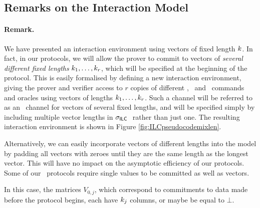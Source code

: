 \subsection{Remarks on the Interaction Model}

\paragraph{Remark.} We have presented an interaction environment using vectors of fixed length $k$. In fact, in our protocols, we will allow the prover to commit to vectors of \emph{several different fixed lengths} $k_1,\ldots,k_r$, which will be specified at the beginning of the protocol. This is easily formalised by defining a new interaction environment, giving the prover and verifier access to $r$ copies of different \ILCcommit, \ILCopen\ and \ILCcheck\ commands and oracles using vectors of lengths $k_1,\ldots,k_r$. Such a channel will be referred to as an \ILC\ channel for vectors of several fixed lengths, and will be specified simply by including multiple vector lengths in $\mathsf{\sigma}_{\mathsf{ILC}~}$ rather than just one. The resulting interaction environment is shown in Figure \ref{fig:ILCpseudocodemixlen}.

Alternatively, we can easily incorporate vectors of different lengths into the model by padding all vectors with zeroes until they are the same length as the longest vector. This will have no impact on the asymptotic efficiency of our protocols. Some of our \ILC\ protocols require single values to be committed as well as vectors. 

In this case, the matrices $V_{0,j}$, which correspond to commitments to data made before the protocol begins, each have $k_j$ columns, or maybe be equal to $\bot$.

